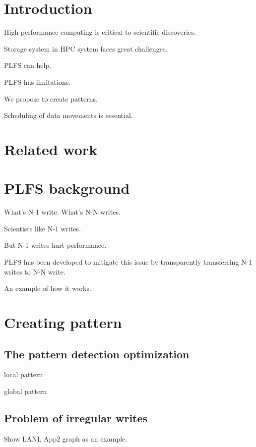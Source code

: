 \documentclass{acm_proc_article-sp}
\begin{document}
\section{Introduction}
High performance computing is critical to scientific
discoveries. 

Storage system in HPC system faces great challenges.

PLFS can help.

PLFS has limitations.

We propose to create patterns.

Scheduling of data movements is essential.

\section{Related work}


\section{PLFS background}
What's N-1 write. What's N-N writes.

Scientists like N-1 writes.


But N-1 writes hurt performance.

PLFS has been developed to mitigate this issue
by transparently transferring N-1 writes to N-N
write.

An example of how it works.


\section{Creating pattern}
\subsection{The pattern detection optimization}
local pattern

global pattern

\subsection{Problem of irregular writes}
Show LANL App2 graph as an example.
\end{document}
